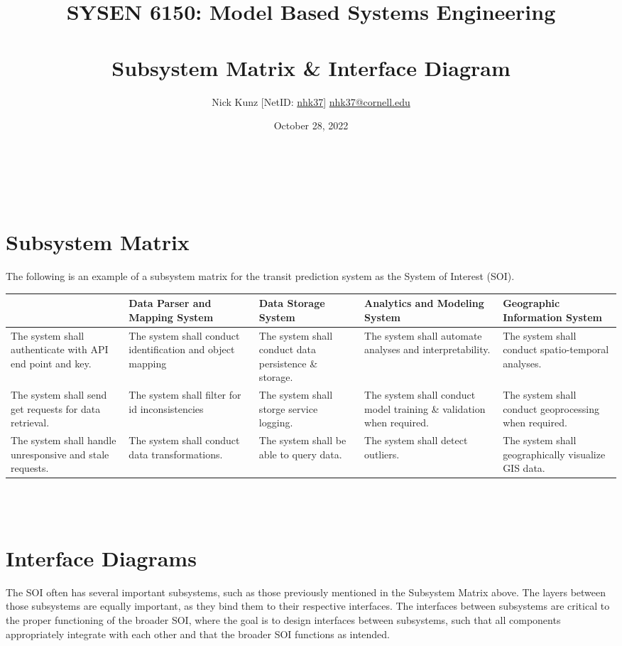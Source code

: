\documentclass{article}
\begin{document}
\title{SYSEN 6150: Model Based Systems Engineering\\~\\
    \Large Subsystem Matrix \& Interface Diagram
}
\author{
    Nick Kunz [NetID: \url{nhk37}] \hyperlink{nhk37@cornell.edu}{nhk37@cornell.edu}
}
\date{October 28, 2022}
\maketitle
\thispagestyle{fancy}

\\~\\
\section*{Subsystem Matrix}
The following is an example of a subsystem matrix for the transit prediction system as the System of Interest (SOI).\\

\begin{tabular}{ | m{70pt} | m{70pt}| m{70pt} | m{70pt} | m{70pt} | }    
    \hline
    \textbf{\centering{Data Collection System}} & \textbf{Data Parser and Mapping System} & \textbf{Data Storage System} & \textbf{Analytics and Modeling System} & \textbf{Geographic Information System}\\ 
    \hline
    The system shall authenticate with API end point and key. & The system shall conduct identification and object mapping & The system shall conduct data persistence \& storage. & The system shall automate analyses and interpretability. & The system shall conduct spatio-temporal analyses.\\ 
    \hline
    The system shall send get requests for data retrieval. & The system shall filter for id inconsistencies & The system shall storge service logging. & The system shall conduct model training \& validation when required. & The system shall conduct geoprocessing when required.\\
    \hline
    The system shall handle unresponsive and stale requests. & The system shall conduct data transformations. & The system shall be able to query data. & The system shall detect outliers. & The system shall geographically visualize GIS data.\\
    \hline
\end{tabular}
\\~\\
\newpage
\section*{Interface Diagrams}
The SOI often has several important subsystems, such as those previously mentioned in the Subsystem Matrix above. The layers between those subsystems are equally important, as they bind them to their respective interfaces. The interfaces between  subsystems are critical to the proper functioning of the broader SOI, where the goal is to design interfaces between subsystems, such that all components appropriately integrate with each other and that the broader SOI functions as intended.\\
\end{document}
